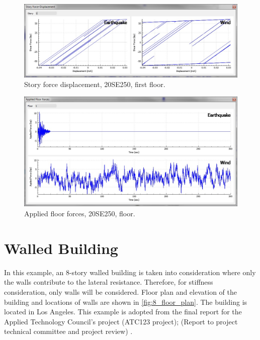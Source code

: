 \documentclass[onecolumn, fleqn]{article}
\begin{document}
\begin{figure}[H]
	\centering \includegraphics[scale=0.35]{20SE250_sfd.JPG}
	\caption{Story force displacement, 20SE250, first floor.}
\end{figure}
\begin{figure}[H]
	\centering \includegraphics[scale=0.35]{20SE250_aff.JPG}
	\caption{Applied floor forces, 20SE250,  floor.}
\end{figure}





\section{Walled Building}
In this example, an 8-story walled building is taken into consideration where only the walls contribute to the lateral resistance. Therefore, for stiffness consideration, only walls will be considered. Floor plan and elevation of the building and locations of walls are shown in \cref{fig:8_floor_plan}. The building is located in Los Angeles. This example is adopted from  the final report for the Applied Technology Council’s project (ATC123 project); (Report to project technical committee and project review) \citep{FEMAp2012}.
\end{document}
